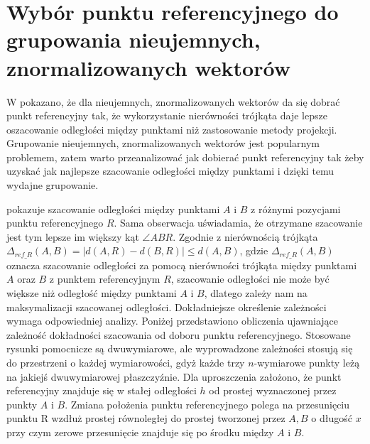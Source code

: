 \section{Wybór punktu referencyjnego do grupowania nieujemnych, znormalizowanych wektorów}
W \cite{tivsp} pokazano, że dla nieujemnych, znormalizowanych wektorów da się dobrać punkt referencyjny tak, że wykorzystanie nierówności trójkąta daje lepsze oszacowanie odległości między punktami niż zastosowanie metody projekcji. Grupowanie nieujemnych, znormalizowanych wektorów jest popularnym problemem, zatem warto przeanalizować jak dobierać punkt referencyjny tak żeby uzyskać jak najlepsze szacowanie odległości między punktami i dzięki temu wydajne grupowanie.\par


 pokazuje szacowanie odległości między punktami $ A $ i $ B $ z różnymi pozycjami punktu referencyjnego $ R $. Sama obserwacja uświadamia, że otrzymane szacowanie jest tym lepsze im większy kąt $ \angle{ABR} $. Zgodnie z nierównością trójkąta $ \Delta_{ref\_R}(A,B) = |d(A,R) - d(B,R)| \le d(A,B) $, gdzie $ \Delta_{ref\_R}(A,B) $ oznacza szacowanie odległości za pomocą nierówności trójkąta między punktami $ A $ oraz $ B $ z punktem referencyjnym $ R $, szacowanie odległości nie może być większe niż odległość między punktami $ A $ i $ B $, dlatego zależy nam na maksymalizacji szacowanej odległości. Dokładniejsze określenie zależności wymaga odpowiedniej analizy. Poniżej przedstawiono obliczenia ujawniające zależność dokładności szacowania od doboru punktu referencyjnego. Stosowane rysunki pomocnicze są dwuwymiarowe, ale wyprowadzone zależności stosują się do przestrzeni o każdej wymiarowości, gdyż każde trzy $ n $-wymiarowe punkty leżą na jakiejś dwuwymiarowej płaszczyźnie. Dla uproszczenia założono, że punkt referencyjny znajduje się w stałej odległości $ h $ od prostej wyznaczonej przez punkty $ A $ i $ B $. Zmiana położenia punktu referencyjnego polega na przesunięciu punktu R wzdłuż prostej równoległej do prostej tworzonej przez $ A, B $ o długość $ x $ przy czym zerowe przesunięcie znajduje się po środku między $ A $ i $ B $.\par



